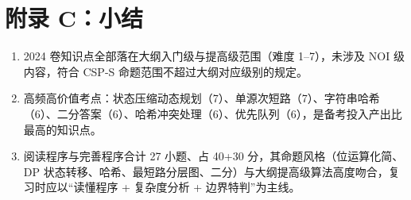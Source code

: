 \documentclass[11pt]{ctexart}
\begin{document}
\section{附录 C：小结}
\begin{enumerate}[leftmargin=2em, itemsep=1pt]
    \item 2024 卷知识点全部落在大纲入门级与提高级范围（难度 1--7），未涉及 NOI 级内容，符合 CSP-S 命题范围不超过大纲对应级别的规定。
    \item 高频高价值考点：状态压缩动态规划（7）、单源次短路（7）、字符串哈希（6）、二分答案（6）、哈希冲突处理（6）、优先队列（6），是备考投入产出比最高的知识点。
    \item 阅读程序与完善程序合计 27 小题、占 40+30 分，其命题风格（位运算化简、DP 状态转移、哈希、最短路分层图、二分）与大纲提高级算法高度吻合，复习时应以“读懂程序 + 复杂度分析 + 边界特判”为主线。
\end{enumerate}
\end{document}
